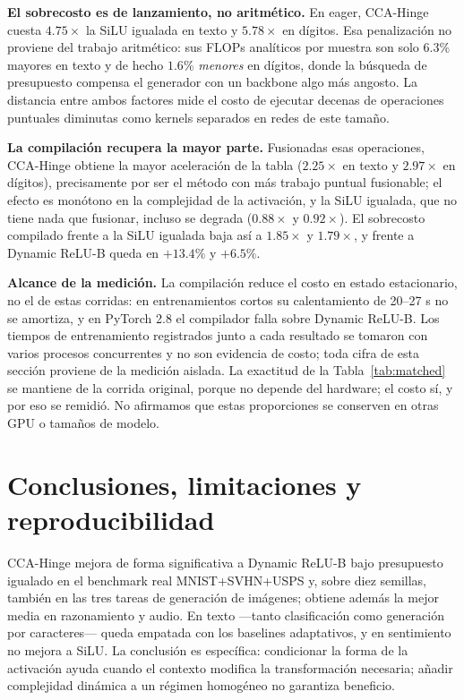 \documentclass[runningheads]{llncs}
\begin{document}
\textbf{El sobrecosto es de lanzamiento, no aritmético.} En eager, CCA-Hinge cuesta $4.75\times$ la SiLU igualada en texto y $5.78\times$ en dígitos. Esa penalización no proviene del trabajo aritmético: sus FLOPs analíticos por muestra son solo $6.3\%$ mayores en texto y de hecho $1.6\%$ \emph{menores} en dígitos, donde la búsqueda de presupuesto compensa el generador con un backbone algo más angosto. La distancia entre ambos factores mide el costo de ejecutar decenas de operaciones puntuales diminutas como kernels separados en redes de este tamaño.

\textbf{La compilación recupera la mayor parte.} Fusionadas esas operaciones, CCA-Hinge obtiene la mayor aceleración de la tabla ($2.25\times$ en texto y $2.97\times$ en dígitos), precisamente por ser el método con más trabajo puntual fusionable; el efecto es monótono en la complejidad de la activación, y la SiLU igualada, que no tiene nada que fusionar, incluso se degrada ($0.88\times$ y $0.92\times$). El sobrecosto compilado frente a la SiLU igualada baja así a $1.85\times$ y $1.79\times$, y frente a Dynamic ReLU-B queda en $+13.4\%$ y $+6.5\%$.

\textbf{Alcance de la medición.} La compilación reduce el costo en estado estacionario, no el de estas corridas: en entrenamientos cortos su calentamiento de 20--27 s no se amortiza, y en PyTorch 2.8 el compilador falla sobre Dynamic ReLU-B. Los tiempos de entrenamiento registrados junto a cada resultado se tomaron con varios procesos concurrentes y no son evidencia de costo; toda cifra de esta sección proviene de la medición aislada. La exactitud de la Tabla~\ref{tab:matched} se mantiene de la corrida original, porque no depende del hardware; el costo sí, y por eso se remidió. No afirmamos que estas proporciones se conserven en otras GPU o tamaños de modelo.

\section{Conclusiones, limitaciones y reproducibilidad}
CCA-Hinge mejora de forma significativa a Dynamic ReLU-B bajo presupuesto igualado en el benchmark real MNIST+SVHN+USPS y, sobre diez semillas, también en las tres tareas de generación de imágenes; obtiene además la mejor media en razonamiento y audio. En texto —tanto clasificación como generación por caracteres— queda empatada con los baselines adaptativos, y en sentimiento no mejora a SiLU. La conclusión es específica: condicionar la forma de la activación ayuda cuando el contexto modifica la transformación necesaria; añadir complejidad dinámica a un régimen homogéneo no garantiza beneficio.
\end{document}
